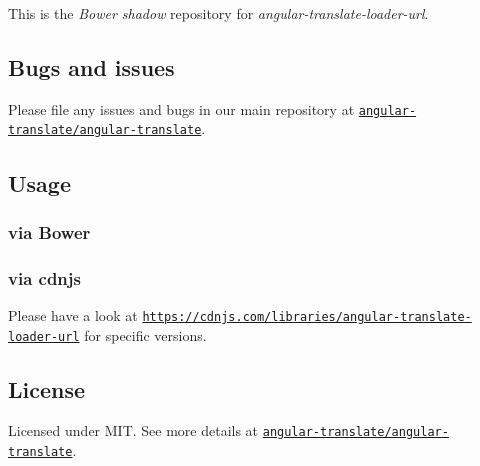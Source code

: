 This is the {\itshape Bower shadow} repository for {\itshape angular-\/translate-\/loader-\/url}.

\subsection*{Bugs and issues}

Please file any issues and bugs in our main repository at \href{https://github.com/angular-translate/angular-translate/issues}{\tt angular-\/translate/angular-\/translate}.

\subsection*{Usage}

\subsubsection*{via Bower}




\subsubsection*{via cdnjs}

Please have a look at \href{https://cdnjs.com/libraries/angular-translate-loader-url}{\tt https\+://cdnjs.\+com/libraries/angular-\/translate-\/loader-\/url} for specific versions.

\subsection*{License}

Licensed under M\+IT. See more details at \href{https://github.com/angular-translate/angular-translate}{\tt angular-\/translate/angular-\/translate}. 